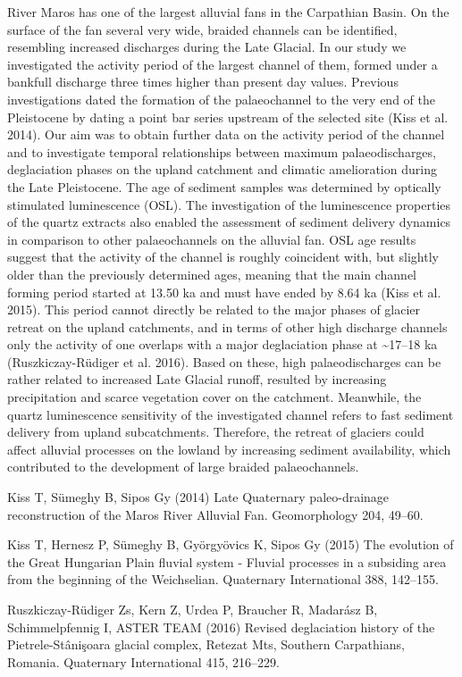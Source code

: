 {River Maros has one of the largest alluvial fans in the Carpathian Basin. On the surface of the fan several very wide, braided channels can be identified, resembling increased discharges during the Late Glacial. In our study we investigated the activity period of the largest channel of them, formed under a bankfull discharge three times higher than present day values. Previous investigations dated the formation of the palaeochannel to the very end of the Pleistocene by dating a point bar series upstream of the selected site (Kiss et al. 2014). Our aim was to obtain further data on the activity period of the channel and to investigate temporal relationships between maximum palaeodischarges, deglaciation phases on the upland catchment and climatic amelioration during the Late Pleistocene. The age of sediment samples was determined by optically stimulated luminescence (OSL). The investigation of the luminescence properties of the quartz extracts also enabled the assessment of sediment delivery dynamics in comparison to other palaeochannels on the alluvial fan. 
OSL age results suggest that the activity of the channel is roughly coincident with, but slightly older than the previously determined ages, meaning that the main channel forming period started at 13.50 ka and must have ended by 8.64 ka (Kiss et al. 2015). This period cannot directly be related to the major phases of glacier retreat on the upland catchments, and in terms of other high discharge channels only the activity of one overlaps with a major deglaciation phase at \textasciitilde17--18 ka (Ruszkiczay-Rüdiger et al. 2016). Based on these, high palaeodischarges can be rather related to increased Late Glacial runoff, resulted by increasing precipitation and scarce vegetation cover on the catchment. Meanwhile, the quartz luminescence sensitivity of the investigated channel refers to fast sediment delivery from upland subcatchments. Therefore, the retreat of glaciers could affect alluvial processes on the lowland by increasing sediment availability, which contributed to the development of large braided palaeochannels.
}%
{Kiss T, Sümeghy B, Sipos Gy (2014) Late Quaternary paleo-drainage reconstruction of the Maros River Alluvial Fan. Geomorphology 204, 49–60.
	
Kiss T, Hernesz P, Sümeghy B, Györgyövics K, Sipos Gy (2015) The evolution of the Great Hungarian Plain fluvial system - Fluvial processes in a subsiding area from the beginning of the Weichselian. Quaternary International 388, 142–155. 
	
Ruszkiczay-Rüdiger Zs, Kern Z, Urdea P, Braucher R, Madarász B, Schimmelpfennig I, ASTER TEAM (2016) Revised deglaciation history of the Pietrele-Stânişoara glacial complex, Retezat Mts, Southern Carpathians, Romania. Quaternary International 415, 216–229.
}%


